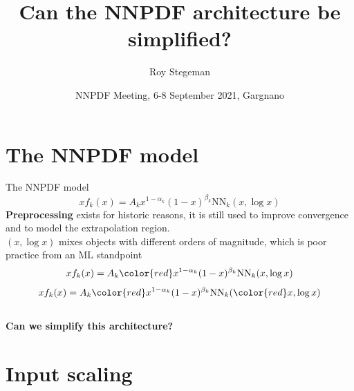 \documentclass[aspectratio=169,11pt]{beamer}
\title{Can the NNPDF architecture be simplified?}
\date{NNPDF Meeting, 6-8 September 2021, Gargnano}
\author{Roy Stegeman}
\institute{University of Milan and INFN Milan}
\newcommand{\nn}{\vspace*{1em}}
\begin{document}
{
\begin{frame}
  \titlepage
\end{frame}
}


\section*{The NNPDF model}



\begin{frame}[t]{The NNPDF model}
   {$$ xf_k(x) = A_k x^{1-\alpha_k}(1-x)^{\beta_k} \mathrm{NN}_k(x,\log x) $$}
   {{\bf Preprocessing} exists for historic reasons, it is still used to improve convergence and to model the extrapolation region. \\ \nn}
   {$(x,\log x)$ mixes objects with different orders of magnitude, which is poor practice from an ML standpoint \\ \nn}
   {$$ xf_k(x) = A_k {\color{red} x^{1-\alpha_k}(1-x)^{\beta_k}} \mathrm{NN}_k(x,\log x) $$}
   {$$ xf_k(x) = A_k {\color{red} x^{1-\alpha_k}(1-x)^{\beta_k}} \mathrm{NN}_k({\color{red} x,\log x}) $$}
   {\\ \vspace*{1.5cm} \bf \centering Can we simplify this architecture?}
\end{frame}


\section{Input scaling}
\end{document}
